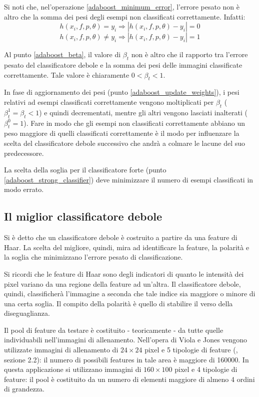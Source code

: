 Si noti che, nel'operazione \ref{adaboost_minimum_error}, l'errore pesato non è altro che la somma dei pesi degli esempi non classificati correttamente. Infatti:
$$ h(x_i, f, p, \theta) = y_i \Rightarrow |h(x_i, f, p, \theta) - y_i| = 0 $$
$$ h(x_i, f, p, \theta) \neq y_i \Rightarrow |h(x_i, f, p, \theta) - y_i| = 1 $$

Al punto \ref{adaboost_beta}, il valore di $\beta_t$ non è altro che il rapporto tra l'errore pesato del classificatore debole e la somma dei pesi delle immagini classificate correttamente. Tale valore è chiaramente $0 < \beta_t < 1$.

In fase di aggiornamento dei pesi (punto \ref{adaboost_update_weights}), i pesi relativi ad esempi classificati correttamente vengono moltiplicati per $\beta_t$ ($\beta_{t}^{1} = \beta_t < 1$) e quindi decrementati, mentre gli altri vengono lasciati inalterati ($\beta_{t}^{0} = 1$). Fare in modo che gli esempi non classificati correttamente abbiano un peso maggiore di quelli classificati correttamente è il modo per influenzare la scelta del classificatore debole successivo che andrà a colmare le lacune del suo predecessore.

La scelta della soglia per il classificatore forte (punto \ref{adaboost_strong_classifier}) deve minimizzare il numero di esempi classificati in modo errato.


\subsection{Il miglior classificatore debole} %
\label{sub:il_miglior_classificatore_debole}
Si è detto che un classificatore debole è costruito a partire da una feature di Haar. La scelta del migliore, quindi, mira ad identificare la feature, la polarità e la soglia che minimizzano l'errore pesato di classificazione.

Si ricordi che le feature di Haar sono degli indicatori di quanto le intensità dei pixel variano da una regione della feature ad un'altra. Il classificatore debole, quindi, classificherà l'immagine a seconda che tale indice sia maggiore o minore di una certa soglia. Il compito della polarità è quello di stabilire il verso della diseguaglianza.

Il pool di feature da testare è costituito - teoricamente - da tutte quelle individuabili nell'immagini di allenamento. Nell'opera di Viola e Jones vengono utilizzate immagini di allenamento di $24 \times 24$ pixel e 5 tipologie di feature (\cite{Viola04}, sezione 2.2): il numero di possibili features in tale area è maggiore di 160000. In questa applicazione si utilizzano immagini di $160 \times 100$ pixel e 4 tipologie di feature: il pool è costituito da un numero di elementi maggiore di almeno 4 ordini di grandezza.

